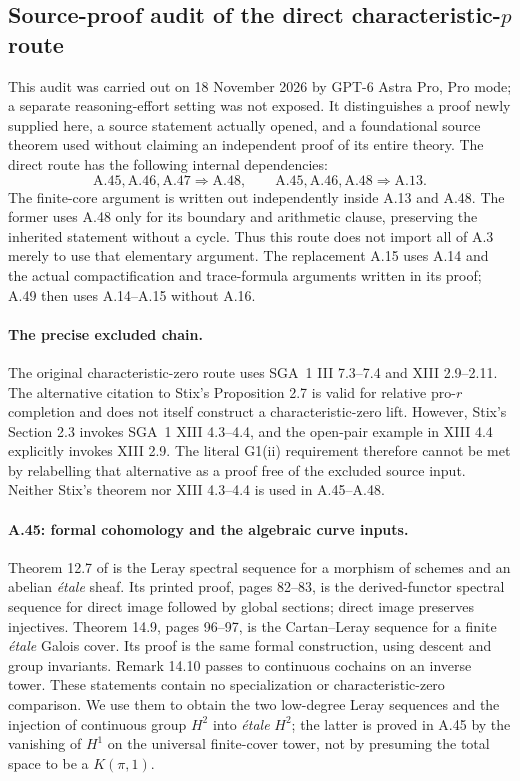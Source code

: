 \subsection{Source-proof audit of the direct characteristic-$p$ route}

This audit was carried out on 18 November 2026 by GPT-6 Astra Pro,
Pro mode; a separate reasoning-effort setting was not exposed.
It distinguishes a proof newly supplied here, a source statement
actually opened, and a foundational source theorem used without
claiming an independent proof of its entire theory. The direct
route has the following internal dependencies:
\[
 \mathrm{A.45},\mathrm{A.46},\mathrm{A.47}\Longrightarrow\mathrm{A.48},
 \qquad
 \mathrm{A.45},\mathrm{A.46},\mathrm{A.48}\Longrightarrow\mathrm{A.13}.
\]
The finite-core argument is written out independently inside A.13
and A.48. The former uses A.48 only for its boundary and arithmetic
clause, preserving the inherited statement without a cycle. Thus this
route does not import all of A.3 merely to use that elementary
argument. The replacement A.15 uses A.14 and the actual
compactification and trace-formula arguments written in its proof;
A.49 then uses A.14--A.15 without A.16.

\paragraph{The precise excluded chain.}
The original characteristic-zero route uses SGA~1 III 7.3--7.4
and XIII 2.9--2.11. The alternative citation to Stix's
Proposition 2.7 is valid for relative pro-$r$ completion and
does not itself construct a characteristic-zero lift. However,
Stix's Section 2.3 invokes SGA~1 XIII 4.3--4.4, and the open-pair
example in XIII 4.4 explicitly invokes XIII 2.9. The literal
G1(ii) requirement therefore cannot be met by relabelling that
alternative as a proof free of the excluded source input.
Neither Stix's theorem nor XIII 4.3--4.4 is used in A.45--A.48.

\paragraph{A.45: formal cohomology and the algebraic curve inputs.}
Theorem 12.7 of \citet{CF_Milne2013} is the Leray spectral sequence
for a morphism of schemes and an abelian \emph{\'etale} sheaf. Its
printed proof, pages 82--83, is the derived-functor spectral
sequence for direct image followed by global sections; direct
image preserves injectives. Theorem 14.9, pages 96--97, is the
Cartan--Leray sequence for a finite \emph{\'etale} Galois cover.
Its proof is the same formal construction, using descent and
group invariants. Remark 14.10 passes to continuous cochains on
an inverse tower. These statements contain no specialization or
characteristic-zero comparison. We use them to obtain the two
low-degree Leray sequences and the injection of continuous group
$H^2$ into \emph{\'etale} $H^2$; the latter is proved in A.45 by
the vanishing of $H^1$ on the universal finite-cover tower, not
by presuming the total space to be a $K(\pi,1)$.

